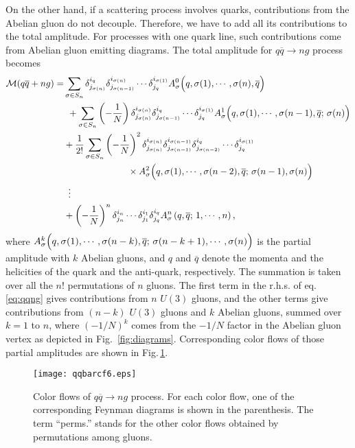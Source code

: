 \documentclass[a4paper,11pt]{article}
\begin{document}
On the other hand, if a scattering process involves quarks, contributions
from the Abelian gluon do not decouple. Therefore, we have to add all
its contributions to the total amplitude. For
processes with one quark line, such contributions come from Abelian gluon
emitting diagrams. The total
amplitude for $q\overline{q}\rightarrow ng$ process becomes
\begin{align}
{\cal M}(q\overline{q}+ng)=&\sum_{\sigma\in S_n}\delta^{i_q}_{j_{\sigma(n)}}
\delta^{i_{\sigma(n)}}_{j_{\sigma(n-1)}}\cdots\delta^{i_{\sigma(1)}}_{j_q}
A^0_{\sigma}\Bigl(q,\sigma(1),\cdots,\sigma(n),\overline{q}\Bigr)\nonumber\\
&\hspace{0.4em}+\sum_{\sigma\in S_n}\left(-\frac{1}{N}\right)\delta^{i_{\sigma(n)}}_{j_{\sigma(n)}}\delta^{i_q}_{j_{\sigma(n-1)}}
\cdots\delta^{i_{\sigma(1)}}_{j_q}A^1_{\sigma}\Bigl(q,\sigma(1),\cdots,\sigma(n-1),\overline{q};\,\sigma(n)\Bigr)\nonumber\\
&+\frac{1}{2!}\sum_{\sigma\in
 S_n}\left(-\frac{1}{N}\right)^2\delta^{i_{\sigma(n)}}_{j_{\sigma(n)}}\delta^{i_{\sigma(n-1)}}_{j_{\sigma(n-1)}}
 \delta^{i_q}_{j_{\sigma(n-2)}}\cdots\delta^{i_{\sigma(1)}}_{j_q}\nonumber\\
&\hspace{7em}\times A^2_{\sigma}\Bigl(q,\sigma(1),\cdots,\sigma(n-2),\overline{q};\,\sigma(n-1),\sigma(n)\Bigr)\nonumber\\
&\hspace{0.5em}\vdots\nonumber\\
&+\left(-\frac{1}{N}\right)^n\delta^{i_n}_{j_n}\cdots\delta^{i_1}_{j_1}\delta^{i_q}_{j_q}
A^n_{\sigma}\left(q,\overline{q};\,1,\cdots,n\right),
\label{eq:qqng}
\end{align}
where
$A^k_{\sigma}\Bigl(q,\sigma(1),\cdots,\sigma(n-k),\overline{q};\,\sigma(n-k+1),\cdots,\sigma(n)\Bigr)$
is the partial amplitude with $k$ Abelian gluons, and $q$ and
$\overline{q}$ denote the momenta and the helicities of the quark and the anti-quark,
respectively. The summation is taken over all the $n!$ permutations of $n$ gluons. The
first term in the r.h.s. of eq.\eqref{eq:qqng} gives contributions from
$n$ $U(3)$ gluons, and the other terms give contributions from
$(n-k)$ $U(3)$ gluons and $k$ Abelian gluons, summed over $k=1$ to
$n$, where $(-1/N)^k$ comes from the $-1/N$ factor in the Abelian gluon vertex as depicted in Fig.~\ref{fig:diagrams}. Corresponding color flows of those partial amplitudes are shown in Fig.\,\ref{fig:qqbarcf}.
\begin{figure}
\begin{center}
\texttt{[image: qqbarcf6.eps]}
\caption{Color flows of $q\overline{q}\rightarrow ng$ process. For each
 color flow, one of the corresponding Feynman diagrams is shown in the parenthesis. The
 term ``perms.'' stands for the other color flows obtained by permutations among gluons.}
\label{fig:qqbarcf}
\end{center}
\end{figure}
\end{document}
